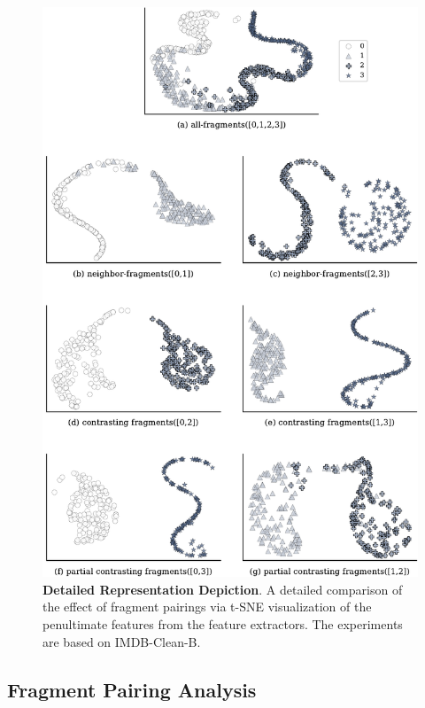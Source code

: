 \documentclass{article}
\theoremstyle{plain}
\theoremstyle{definition}
\theoremstyle{remark}
\begin{document}
\begin{figure}[t]
    \begin{center}
    \centerline{\includegraphics[width=0.7\columnwidth]{imgs/fragment_tsne.pdf}}
    \caption{\textbf{Detailed Representation Depiction}.
    A detailed comparison of the effect of fragment pairings via t-SNE visualization of the penultimate features from the feature extractors.
    The experiments are based on IMDB-Clean-B.
    }
    \label{fig:feature_space_depict}
    \end{center}
    \vskip -0.1in
\end{figure}



\subsection{Fragment Pairing Analysis}\label{subsec:contrast_combination}
\end{document}
